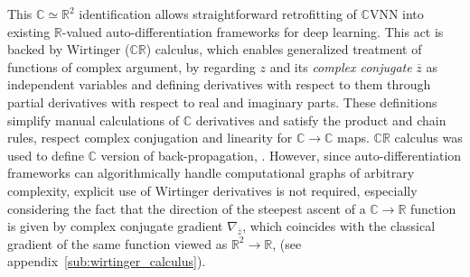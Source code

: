 \documentclass[a4paper,10pt,twocolumn]{article}
\newcommand{\real}{\mathbb{R}}
\newcommand{\cplx}{\mathbb{C}}
\newcommand{\conj}[1]{\overline{#1}}
\begin{document}
This $\cplx \simeq \real^2$ identification allows straightforward retrofitting of $\cplx$VNN
into existing $\real$-valued auto-differentiation frameworks for deep learning. This
act is backed by Wirtinger ($\cplx\real$) calculus, which enables generalized treatment
of functions of complex argument, by regarding $z$ and its \emph{complex conjugate}
$\conj{z}$ as independent variables and defining derivatives with respect to them through
partial derivatives with respect to real and imaginary parts. These definitions simplify
manual calculations of $\cplx$ derivatives and satisfy the product and chain rules, respect
complex conjugation and linearity for $\cplx \to \cplx$ maps. $\cplx\real$ calculus was
used to define $\cplx$ version of back-propagation,
\citep{benvenuto_complex_1992,guberman_complex_2016}.
However, since auto-differentiation frameworks can algorithmically handle computational
graphs of arbitrary complexity, explicit use of Wirtinger derivatives is not required,
especially considering the fact that the direction of the steepest ascent of a $
  \cplx \to \real
$ function is given by complex conjugate gradient $\nabla_{\conj{z}}$, which coincides
with the classical gradient of the same function viewed as $\real^2 \to \real$,
(see appendix~\ref{sub:wirtinger_calculus}).
%
%
%
\end{document}
